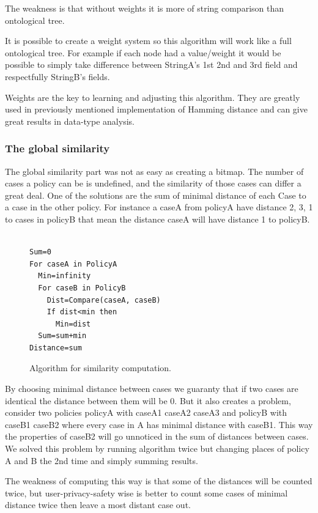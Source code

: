The weakness is that without weights it is more of string comparison than ontological tree.

It is possible to create a weight system so this algorithm will work like a full ontological tree. For example if each node had a value/weight it would be possible to simply take difference between StringA's 1st 2nd and 3rd field and respectfully StringB's fields.
 
Weights are the key to learning and adjusting this algorithm. They are greatly used in previously mentioned implementation of Hamming distance and can give great results in data-type analysis.

\subsubsection{ The global similarity }
The global similarity part was not as easy as creating a bitmap. The number of cases a policy can be is undefined, and the similarity of those cases can differ a great deal. One of the solutions are the sum of minimal distance of each Case to a case in the other policy. For instance a caseA from policyA have distance 2, 3, 1 to cases in policyB that mean the distance caseA will have distance 1 to policyB. 

\begin{figure}[htpb]

\begin{verbatim}

Sum=0
For caseA in PolicyA
  Min=infinity
  For caseB in PolicyB
    Dist=Compare(caseA, caseB)
    If dist<min then
      Min=dist
  Sum=sum+min
Distance=sum
\end{verbatim}

  \caption{Algorithm for similarity computation.}
  \label{similAlgo}
\end{figure}
 

By choosing minimal distance between cases we guaranty that if two cases are identical the distance between them will be 0. But it also creates a problem, consider two policies policyA with {caseA1 caseA2 caseA3} and policyB with {caseB1 caseB2} where every case in A has minimal distance with caseB1. This way the properties of caseB2 will go unnoticed in the sum of distances between cases. We solved this problem by running algorithm twice but changing places of policy A and B the 2nd time and simply summing results.

The weakness of computing this way is that some of the distances will be counted twice, but user-privacy-safety wise is better to count some cases of minimal distance twice then leave a most distant case out.

